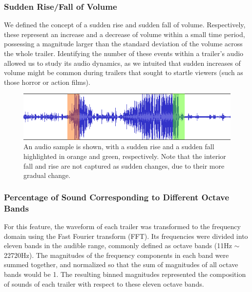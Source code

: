\documentclass[letterpaper, 10 pt, conference]{ieeeconf}  %
\begin{document}
\subsubsection{Sudden Rise/Fall of Volume}
We defined the concept of a sudden rise and sudden fall of volume. Respectively, these represent an increase and a decrease of volume within a small time period, possessing a magnitude larger than the standard deviation of the volume across the whole trailer. Identifying the number of these events within a trailer's audio allowed us to study its audio dynamics, as we intuited that sudden increases of volume might be common during trailers that sought to startle viewers (such as those horror or action films).

\begin{figure}[h]
	\centering
	\includegraphics[width=\columnwidth]{audio_peaks.png}
	\caption{An audio sample is shown, with a sudden rise and a sudden fall highlighted in orange and green, respectively. Note that the interior fall and rise are not captured as sudden changes, due to their more gradual change.}
	\label{f:audio_peaks}
\end{figure}


\subsubsection{Percentage of Sound Corresponding to Different Octave Bands}
For this feature, the waveform of each trailer was transformed to the frequency domain using the Fast Fourier transform (FFT). Its frequencies were divided into eleven bands in the audible range, commonly defined as octave bands (11Hz $\sim$ 22720Hz). The magnitudes of the frequency components in each band were summed together, and normalized so that the sum of magnitudes of all octave bands would be 1. The resulting binned magnitudes represented the composition of sounds of each trailer with respect to these eleven octave bands. 
\end{document}
